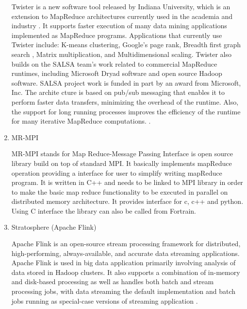\begin{enumerate}
Twister is a new software tool released by Indiana University,
which is an extension to MapReduce architectures currently used
in the academia and industry \label{\detokenize{i524/technologies:id279}}{\hyperref[\detokenize{i524/technologies:www-twister1}]{\sphinxcrossref{{[}233{]}}}}. It supports
faster execution of many data mining applications implemented as
MapReduce programs. Applications that currently use Twister
include: K-means clustering, Google's page rank, Breadth first
graph search , Matrix multiplication, and Multidimensional
scaling. Twister also builds on the SALSA team's work related to
commercial MapReduce runtimes, including Microsoft Dryad software
and open source Hadoop software. SALSA project work is funded in
part by an award from Microsoft, Inc. The archite cture is based
on pub/sub messaging that enables it to perform faster data
transfers, minimizing the overhead of the runtime. Also, the
support for long running processes improves the efficiency of the
runtime for many iterative MapReduce
computations. \label{\detokenize{i524/technologies:id280}}{\hyperref[\detokenize{i524/technologies:www-twister2}]{\sphinxcrossref{{[}234{]}}}} \label{\detokenize{i524/technologies:id281}}{\hyperref[\detokenize{i524/technologies:www-twister3}]{\sphinxcrossref{{[}235{]}}}}
\label{\detokenize{i524/technologies:id282}}{\hyperref[\detokenize{i524/technologies:paper-twister}]{\sphinxcrossref{{[}236{]}}}}.

\item {} 
MR-MPI

\label{\detokenize{i524/technologies:id283}}{\hyperref[\detokenize{i524/technologies:www-mapreducempi}]{\sphinxcrossref{{[}237{]}}}} MR-MPI stands for Map Reduce-Message
Passing Interface is open source library build on top of standard
MPI. It basically implements mapReduce operation providing a
interface for user to simplify writing mapReduce program.  It is
written in C++ and needs to be linked to MPI library in order to
make the basic map reduce functionality to be executed in
parallel on distributed memory architecture.  It provides
interface for c, c++ and python. Using C interface the library
can also be called from Fortrain.

\item {} 
Stratosphere (Apache Flink)

Apache Flink is an open-source stream processing framework for
distributed, high-performing, always-available, and accurate data
streaming applications. Apache Flink is used in big data application
primarily involving analysis of data stored in Hadoop clusters.
It also supports a combination of in-memory and disk-based processing
as well as handles both batch and stream processing jobs, with data
streaming the default implementation and batch jobs running as
special-case versions of streaming application \label{\detokenize{i524/technologies:id284}}{\hyperref[\detokenize{i524/technologies:www-flink}]{\sphinxcrossref{{[}238{]}}}}.


\end{enumerate}
